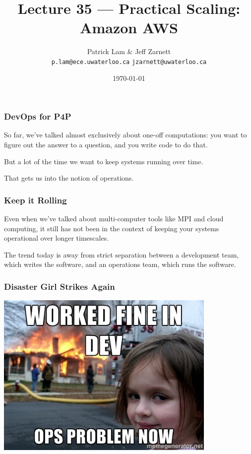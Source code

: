 

\title{Lecture 35 --- Practical Scaling: Amazon AWS }

\author{Patrick Lam \& Jeff Zarnett \\ \small \texttt{p.lam@ece.uwaterloo.ca} \texttt{jzarnett@uwaterloo.ca}}
\date{\today}




\begin{frame}
  \titlepage

 \end{frame}



\begin{frame}
\frametitle{DevOps for P4P}

So far, we've talked almost exclusively about one-off computations:
you want to figure out the answer to a question, and you write code to
do that.

But a lot
of the time we want to keep systems running over time. 

That gets us into the notion of operations. 

\end{frame}



\begin{frame}
\frametitle{Keep it Rolling}

Even when we've talked about multi-computer tools like MPI and cloud
computing, it still has not been in the context of keeping your
systems operational over longer timescales. 

The trend today is away
from strict separation between a development team, which writes the
software, and an operations team, which runs the software.

\end{frame}



\begin{frame}
\frametitle{Disaster Girl Strikes Again}

\begin{center}
	\includegraphics[width=0.8\textwidth]{images/devops.jpg}
\end{center}

\end{frame}



